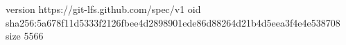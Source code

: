 version https://git-lfs.github.com/spec/v1
oid sha256:5a678f11d5333f2126fbee4d2898901ede86d88264d21b4d5eea3f4e4e538708
size 5566
